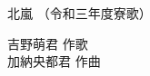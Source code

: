 \documentclass[10pt,b5j]{tarticle} %
\begin{document}
\begin{minipage}[c]{0.7\hsize} %
    \begin{center}
        {\LARGE
            北嵐 %
        }
        {\small 
            （令和三年度寮歌） %
        }
    \end{center}
\end{minipage}
\begin{minipage}[c]{0.3\hsize} %
    \begin{flushright} %
        吉野萌君 作歌\\加納央都君 作曲 %
    \end{flushright}
\end{minipage}
\end{document}

